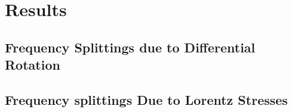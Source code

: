 \chapter{Results}  %

\ifpdf
    \graphicspath{{Chapter1/Figs/Raster/}{Chapter1/Figs/PDF/}{Chapter1/Figs/}}
\else
    \graphicspath{{Chapter1/Figs/Vector/}{Chapter1/Figs/}}
\fi


\section{Frequency Splittings due to Differential Rotation} %




\section{Frequency splittings Due to Lorentz Stresses} %
